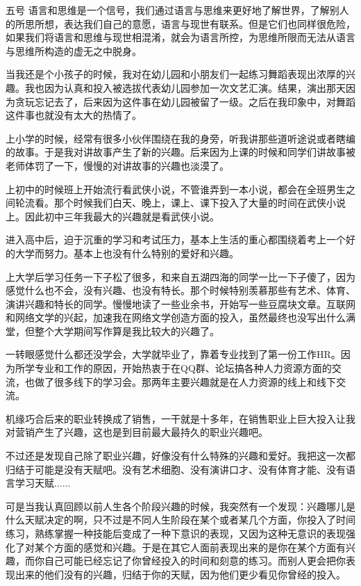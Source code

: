 \documentclass[11pt,a4paper]{article}
\newcommand{\asong}{\CJKfamily{asong}}
\newcommand{\wuhao}{\fontsize{10.5pt}{10.5pt}\selectfont}
\begin{document}
\wuhao  \asong 五号
 语言和思维是一个信号，我们通过语言与思维来更好地了解世界，了解别人的所思所想，表达我们自己的意愿，语言与现世有联系。但是它们也同样很危险，如果我们将语言和思维与现世相混淆，就会为语言所控，为思维所限而无法从语言与思维所构造的虚无之中脱身。
\clearpage
\wuhao

﻿当我还是个小孩子的时候，我对在幼儿园和小朋友们一起练习舞蹈表现出浓厚的兴趣。我也因为认真和投入被选拔代表幼儿园参加一次文艺汇演。结果，演出那天因为贪玩忘记去了，后来因为这件事在幼儿园被留了一级。之后在我印象中，对舞蹈这件事也就没有太大的热情了。﻿﻿

上小学的时候，经常有很多小伙伴围绕在我的身旁，听我讲那些道听途说或者瞎编的故事。于是我对讲故事产生了新的兴趣。后来因为上课的时候和同学们讲故事被老师体罚了一下，慢慢的对讲故事的兴趣也淡漠了。﻿﻿

上初中的时候班上开始流行看武侠小说，不管谁弄到一本小说，都会在全班男生之间轮流看。那个时候我们白天、晚上，课上、课下投入了大量的时间在武侠小说上。因此初中三年我最大的兴趣就是看武侠小说。﻿﻿

进入高中后，迫于沉重的学习和考试压力，基本上生活的重心都围绕着考上一个好的大学而努力。基本上也没有什么特别的爱好和兴趣。﻿﻿

上大学后学习任务一下子松了很多，和来自五湖四海的同学一比一下子傻了，因为感觉什么也不会，没有兴趣、也没有特长。那个时候特别羡慕那些有艺术、体育、演讲兴趣和特长的同学。慢慢地读了一些业余书，开始写一些豆腐块文章。互联网和网络文学的兴起，加速我在网络文学创造方面的投入，虽然最终也没写出什么满堂，但整个大学期间写作算是我比较大的兴趣了。﻿﻿

一转眼感觉什么都还没学会，大学就毕业了，靠着专业找到了第一份工作HR。因为所学专业和工作的原因，开始热衷于在QQ群、论坛搞各种人力资源方面的交流，也做了很多线下的学习会。那两年主要兴趣就是在人力资源的线上和线下交流。﻿﻿

机缘巧合后来的职业转换成了销售，一干就是十多年，在销售职业上巨大投入让我对营销产生了兴趣，这也是到目前最大最持久的职业兴趣吧。﻿﻿

不过还是发现自己除了职业兴趣，好像没有什么特殊的兴趣和爱好。我把这一次都归结于可能是没有天赋吧。没有艺术细胞、没有演讲口才、没有体育才能、没有语言学习天赋......﻿﻿

可是当我认真回顾以前人生各个阶段兴趣的时候，我突然有一个发现：兴趣哪儿是什么天赋决定的啊，只不过是不同人生阶段在某个或者某几个方面，你投入了时间练习，熟练掌握一种技能后变成了一种下意识的表现，又因为这种无意识的表现强化了对某个方面的感觉和兴趣。于是在其它人面前表现出来的是你在某个方面有兴趣，而你自己可能已经忘记了你曾经投入的时间和刻意的练习。而别人更会把你表现出来的他们没有的兴趣，归结于你的天赋，因为他们更少看见你曾经的投入。﻿﻿
\end{document}
